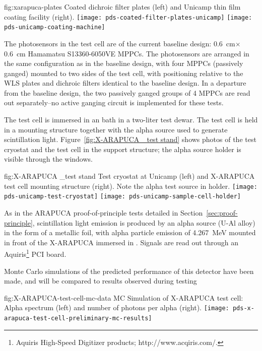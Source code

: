 \begin{dunefigure}{fig:xarapuca-plates}
{Coated dichroic filter plates (left) and Unicamp thin film coating facility (right).} 
	\texttt{[image: pds-coated-filter-plates-unicamp]}\quad
	\texttt{[image: pds-unicamp-coating-machine]}
\end{dunefigure}

The photosensors in the test cell are of the current baseline design:  \SI{0.6}{cm}$\times$\SI{0.6}{cm} Hamamatsu S13360-6050VE MPPCs.  The photosensors are arranged in the same configuration as in the baseline design, with four MPPCs (passively ganged) mounted to two sides of the test cell, with positioning relative to the WLS plates and dichroic filters identical to the baseline design.  In a departure from the baseline design, the two passively ganged groups of 4 MPPCs are read out separately--no active ganging circuit is implemented for these tests.

The test cell is immersed in an  bath in a two-liter test dewar.  The test cell is held in a mounting structure together with the alpha source used to generate scintillation light. Figure~\ref{fig:X-ARAPUCA _test stand} shows photos of the test cryostat and the test cell in the support structure; the alpha source holder is visible through the windows. 

\begin{dunefigure}{fig:X-ARAPUCA _test stand}
{Test cryostat at Unicamp (left) and X-ARAPUCA test cell mounting structure (right).  Note the alpha test source in holder.} 
	\texttt{[image: pds-unicamp-test-cryostat]} \quad
	\texttt{[image: pds-unicamp-sample-cell-holder]}
\end{dunefigure}  

As in the ARAPUCA proof-of-principle tests detailed in Section~\ref{sec:proof-principle}, scintillation light emission is produced by an alpha source (U-Al alloy) in the form of a metallic foil, with alpha particle emission of \SI{4.267}{MeV} mounted in front of the X-ARAPUCA immersed in \lar. Signals are read out through an Aquiris\footnote{Aquiris High-Speed Digitizer products; http://www.acqiris.com/.} PCI board.

Monte Carlo simulations of the predicted performance of this detector have been made, and will be compared to results observed during testing

\begin{dunefigure}{fig:X-ARAPUCA-test-cell-mc-data}
{MC Simulation of X-ARAPUCA test cell: Alpha spectrum (left) and number of photons per alpha (right).} 
	\texttt{[image: pds-x-arapuca-test-cell-preliminary-mc-results]}
    \vspace{-3cm}
\end{dunefigure}


